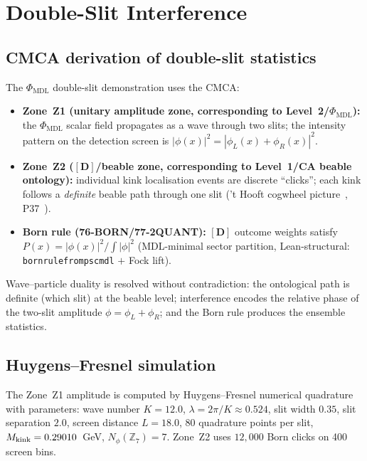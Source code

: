 \documentclass[11pt]{article}
\theoremstyle{remark}
\newcommand{\PHIMDL}{\Phi_{\mathrm{MDL}}}
\newcommand{\ZS}{\mathbb{Z}_7}
\newcommand{\lean}[1]{%
  \penalty-100
  \begingroup\def\_{\textunderscore\allowbreak}\texttt{#1}\endgroup}
\begin{document}
\section{Double-Slit Interference}
\label{sec:dslit}

\subsection{CMCA derivation of double-slit statistics}
\label{ssec:dslit_derivation}

The $\PHIMDL$ double-slit demonstration uses the CMCA:

\begin{itemize}[noitemsep]
  \item \textbf{Zone~Z1 (unitary amplitude zone, corresponding to Level~2/$\PHIMDL$):} the $\PHIMDL$ scalar field
    propagates as a wave through two slits; the intensity pattern on the
    detection screen is $|\phi(x)|^2=|\phi_L(x)+\phi_R(x)|^2$.
  \item \textbf{Zone~Z2 ($[\mathbf{D}]$/beable zone, corresponding to Level~1/CA beable ontology):} individual kink
    localisation events are discrete ``clicks''; each kink follows a
    \emph{definite} beable path through one slit ('t Hooft cogwheel
    picture~\cite{tHooft2016CA}, P37~\cite{SpivackQMFromR110}).
  \item \textbf{Born rule (76-BORN/77-2QUANT):} $[\mathbf{D}]$ outcome
    weights satisfy $P(x)=|\phi(x)|^2/\int|\phi|^2$ (MDL-minimal sector
    partition, Lean-structural: \lean{born\_rule\_from\_psc\_mdl} $+$ Fock lift).
\end{itemize}

Wave--particle duality is resolved without contradiction: the ontological
path is definite (which slit) at the beable level; interference encodes
the relative phase of the two-slit amplitude $\phi=\phi_L+\phi_R$;
and the Born rule produces the ensemble statistics.

\subsection{Huygens--Fresnel simulation}
\label{ssec:dslit_numerical}

The Zone~Z1 amplitude is computed by Huygens--Fresnel numerical quadrature
with parameters: wave number $K=12.0$, $\lambda=2\pi/K\approx 0.524$,
slit width $0.35$, slit separation $2.0$, screen distance $L=18.0$,
80 quadrature points per slit, $M_{\rm kink}=0.29010$~GeV,
$N_\phi(\ZS)=7$.  Zone~Z2 uses $12{,}000$ Born clicks on 400 screen bins.
\end{document}
